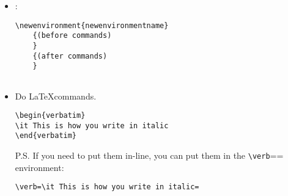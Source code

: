 \begin{itemize}
\begin{verbatim}
\def\bar{goodbye}
\fooi +\fooii
\end{verbatim}

This produces

\begin{verbatim}
hello+hello
hello+goodbye
\end{verbatim}

However it's also a subtle one, so it might be worth highlighting a few key points:

When TeX encounters control sequences such as \verb=\fooi=, it evaluates them; if these are macros (that is, they have been defined by \verb=\def=, or \verb=\let= equal to something which was defined by \verb=\def=), then the result is that they will expand to other tokens, which TeX will then examine in turn, and so on, recursively, until what's left is either ‘primitive’ control sequences or letters (I'm simplifying a little bit).
\verb=\fooi= expands directly to the characters hello (because \verb=\bar= initially did, and \verb=\fooi= was defined to have the same value).
\verb=\fooii=, in contrast, expands to \verb=\bar=, which is then immediately reexamined and reexpanded. In the first case, \verb=\bar= expands to hello and in the second case to goodbye. The definition of \verb=\fooii= hasn't changed, but \verb=\bar= has been redefined in between.

\item {}:


\begin{lstlisting}
\newenvironment{newenvironmentname}
    {(before commands)
    }
    {(after commands)
    }
 
\end{lstlisting}

\item Do  \LaTeX commands.\thechapter\thecherrychapter


\begin{lstlisting}
\begin{verbatim}
\it This is how you write in italic
\end{verbatim}
\end{lstlisting}

P.S. If you need to put them in-line, you can put them in the \verb=\verb=== environment:
\begin{lstlisting}
\verb=\it This is how you write in italic=
\end{lstlisting}


\end{itemize}

